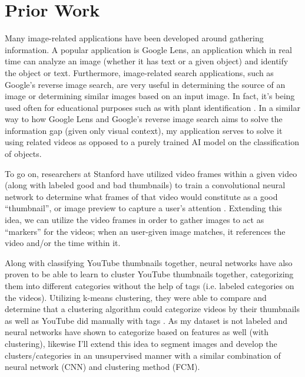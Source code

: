 \documentclass[10pt,twocolumn]{article}
\begin{document}




\section{Prior Work}

Many image-related applications have been developed around gathering information. A popular application is Google Lens, an application which in real time can analyze an image (whether it has text or a given object) and identify the object or text. Furthermore, image-related search applications, such as Google’s reverse image search, are very useful in determining the source of an image or determining similar images based on an input image. In fact, it’s being used often for educational purposes such as with plant identification \cite{Moore2018}. In a similar way to how Google Lens and Google’s reverse image search aims to solve the information gap (given only visual context), my application serves to solve it using related videos as opposed to a purely trained AI model on the classification of objects.

To go on, researchers at Stanford have utilized video frames within a given video (along with labeled good and bad thumbnails) to train a convolutional neural network to determine what frames of that video would constitute as a good “thumbnail”, or image preview to capture a user’s attention \cite{Stanford2017}. Extending this idea, we can utilize the video frames in order to gather images to act as “markers” for the videos; when an user-given image matches, it references the video and/or the time within it.

Along with classifying YouTube thumbnails together, neural networks have also proven to be able to learn to cluster YouTube thumbnails together, categorizing them into different categories without the help of tags (i.e. labeled categories on the videos). Utilizing k-means clustering, they were able to compare and determine that a clustering algorithm could categorize videos by their thumbnails as well as YouTube did manually with tags \cite{Stanford2021}. As my dataset is not labeled and neural networks have shown to categorize based on features as well (with clustering), likewise I'll extend this idea to segment images and develop the clusters/categories in an unsupervised manner with a similar combination of neural network (CNN) and clustering method (FCM).
\end{document}
